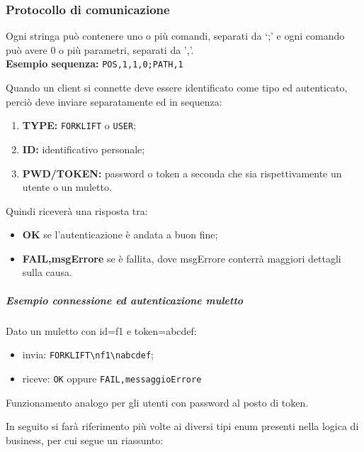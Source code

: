 \clearpage
\subsubsection{Protocollo di comunicazione}
\label{comm-protocol}

Ogni stringa può contenere uno o più comandi, separati da ‘;' e ogni comando può avere 0 o più parametri, separati da ',’. \\
\textbf{Esempio sequenza:} \texttt{POS,1,1,0;PATH,1}

    Quando un client si connette deve essere identificato come tipo ed autenticato, perciò deve inviare separatamente ed in sequenza:
    \begin{enumerate}
        \item \textbf{TYPE: }\texttt{FORKLIFT} o \texttt{USER};
        \item \textbf{ID: } identificativo personale;
        \item \textbf{PWD/TOKEN: } password o token a seconda che sia rispettivamente un utente o un muletto.
    \end{enumerate}
    Quindi riceverà una risposta tra:
    \begin{itemize}
        \item \textbf{OK } se l'autenticazione è andata a buon fine;
        \item \textbf{FAIL,msgErrore} se è fallita, dove msgErrore conterrà maggiori dettagli sulla causa.
    \end{itemize}
    \subparagraph{Esempio connessione ed autenticazione muletto}
        Dato un muletto con id=f1 e token=abcdef:
        \begin{itemize}
            \item invia: \texttt{FORKLIFT\textbackslash nf1\textbackslash nabcdef};

            \item riceve: \texttt{OK} oppure \texttt{FAIL,messaggioErrore}
        \end{itemize}


        Funzionamento analogo per gli utenti con password al posto di token.

    In seguito si farà riferimento più volte ai diversi tipi enum presenti nella logica di business, per cui segue un riassunto:


